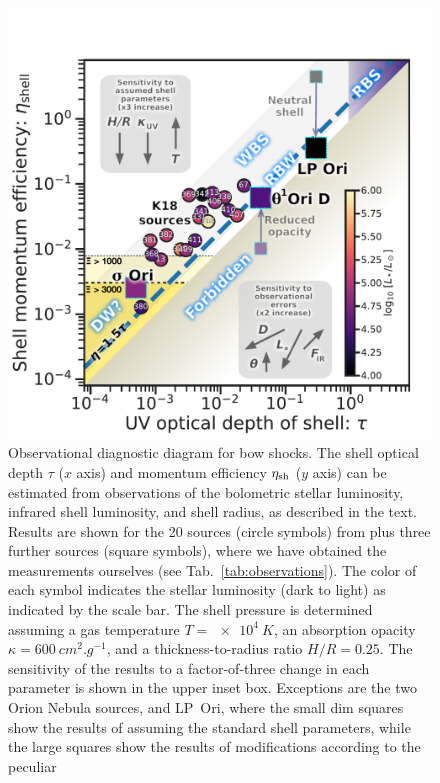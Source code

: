 \begin{figure}
  \centering
  \includegraphics[width=\linewidth]{figs/All-sources-eta-tau}
  \caption[Observational diagnostic diagram]{Observational diagnostic
    diagram for bow shocks.  The shell optical depth \(\tau\) (\(x\)
    axis) and momentum efficiency \(\eta_{\text{sh}}\) (\(y\) axis) can be
    estimated from observations of the bolometric stellar luminosity,
    infrared shell luminosity, and shell radius, as described in the
    text.  Results are shown for the 20 sources (circle symbols) from
    \citet{Kobulnicky:2018a} plus three further sources (square
    symbols), where we have obtained the measurements ourselves (see
    Tab.~\ref{tab:observations}).  The color of each symbol indicates
    the stellar luminosity (dark to light) as indicated by the scale
    bar. The shell pressure is determined assuming a gas temperature
    \(T = \SI{e4}{K}\), an absorption opacity
    \(\kappa = \SI{600}{cm^2.g^{-1}}\), and a thickness-to-radius ratio
    \(H/R = 0.25\).  The sensitivity of the results to a
    factor-of-three change in each parameter is shown in the upper
    inset box.  Exceptions are the two Orion Nebula sources, \thD{}
    and LP~Ori, where the small dim squares show the results of
    assuming the standard shell parameters, while the large squares
    show the results of modifications according to the peculiar
}
\end{figure}

